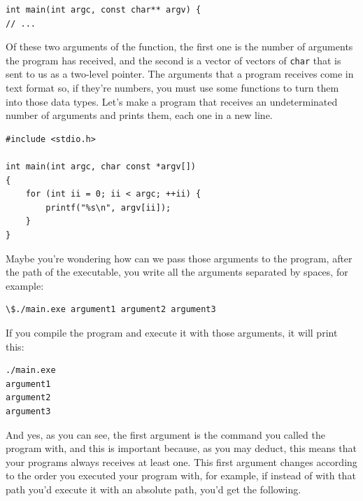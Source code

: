\documentclass[a4paper]{article}
\begin{document}
\noindent
\begin{minipage}[H]{\linewidth}
\mbox{}
\begin{lstlisting}[style=C,
caption={Declaration of a \texttt{main} function that receives arguments},
label={lst:mainArguments}]
int main(int argc, const char** argv) {
// ...
\end{lstlisting}
\end{minipage}

Of these two arguments of the function, the first one is the number of arguments
the program has
received, and the second is a vector of vectors of \verb!char! that is sent to
us as a two-level pointer. The arguments that a program receives come in text
format so, if they're numbers, you must use some functions to turn them into
those data types. Let's make a program that receives an undeterminated number
of arguments and prints them, each one in a new line.

\noindent
\begin{minipage}[H]{\linewidth}
\mbox{}
\begin{lstlisting}[style=C,
caption={Ussage of the arguments or a program},
label={lst:argumentProgram}]
#include <stdio.h>

int main(int argc, char const *argv[])
{
    for (int ii = 0; ii < argc; ++ii) {
        printf("%s\n", argv[ii]);
    }
}
\end{lstlisting}
\end{minipage}

Maybe you're wondering how can we pass those arguments to the program, after the
path of the executable, you write all the arguments separated by spaces, for
example:
\begin{lstlisting}[style=terminalStyle]
\$./main.exe argument1 argument2 argument3
\end{lstlisting}
If you compile the program and execute it with those arguments, it will print
this:

\begin{lstlisting}[style=terminalStyle]
./main.exe
argument1
argument2
argument3
\end{lstlisting}

And yes, as you can see, the first argument is the command you called the
program with, and this is important because, as you may deduct, this means
that your programs always receives at least one. This first argument changes
according to the order you executed your program with, for example, if instead
of with that path you'd execute it with an absolute path, you'd get the
following.
\end{document}

